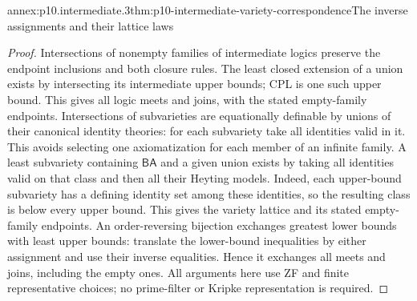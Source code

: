 \begin{annexitem}{annex:p10.intermediate.3}{thm:p10-intermediate-variety-correspondence}{The inverse assignments and their lattice laws}
\begin{proof}
Intersections of nonempty families of intermediate logics preserve
the endpoint inclusions and both closure rules.  The least closed
extension of a union exists by intersecting its intermediate upper
bounds; CPL is one such upper bound.  This gives all logic meets
and joins, with the stated empty-family endpoints.
Intersections of subvarieties are equationally definable by unions
of their canonical identity theories: for each subvariety take all
identities valid in it.  This avoids selecting one axiomatization
for each member of an infinite family.  A least subvariety containing
\(\mathsf{BA}\) and a given union exists by taking all identities
valid on that class and then all their Heyting models.
Indeed, each upper-bound subvariety has a defining identity set
among these identities, so the resulting class is below every upper bound.
This gives the variety lattice and its stated empty-family endpoints.
An order-reversing bijection exchanges greatest lower bounds with
least upper bounds: translate the lower-bound inequalities by either
assignment and use their inverse equalities.  Hence it exchanges
all meets and joins, including the empty ones.
All arguments here use ZF and finite representative choices;
no prime-filter or Kripke representation is required.
\end{proof}
\end{annexitem}
